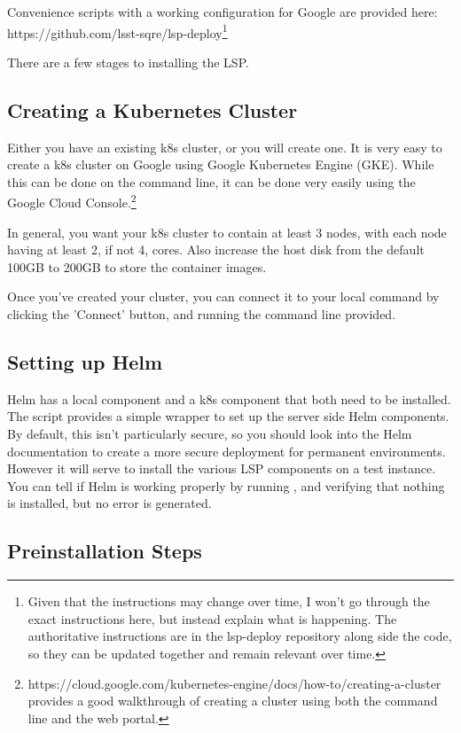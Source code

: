 \documentclass[11pt,twoside]{article}
\begin{document}
Convenience scripts with a working configuration for Google are provided here:
https://github.com/lsst-sqre/lsp-deploy\footnote{Given that the instructions
may change over time, I won't go through the exact
instructions here, but instead explain what is happening.  The authoritative instructions
are in the lsp-deploy repository along side the code, so they can be updated together
and remain relevant over time.}

There are a few stages to installing the LSP.

\subsection{Creating a Kubernetes Cluster}

Either you have an existing k8s cluster, or you will create one.  It is very
easy to create a k8s cluster on Google using Google Kubernetes Engine (GKE).
While this can be done on the command line, it can be done very easily
using the Google Cloud Console.\footnote{https://cloud.google.com/kubernetes-engine/docs/how-to/creating-a-cluster
provides a good walkthrough of creating a cluster using both the command line
and the web portal.}

In general, you want your k8s cluster to contain at least 3 nodes, with each node
having at least 2, if not 4, cores.  Also increase the host disk from
the default 100GB to 200GB to store the container images.

Once you've created your cluster, you can connect it to your local 
command by clicking the 'Connect' button, and running the command line provided.

\subsection{Setting up Helm}

Helm has a local component and a k8s component that both need to be installed.
The  script provides a simple wrapper to set up the
server side Helm components.
By default, this isn't particularly secure, so you should look into the Helm
documentation to create a more secure deployment for permanent environments.
However it will serve to install the various LSP components on a test instance.
You can tell if Helm is working properly by running , and verifying
that nothing is installed, but no error is generated.

\subsection{Preinstallation Steps}
\end{document}

